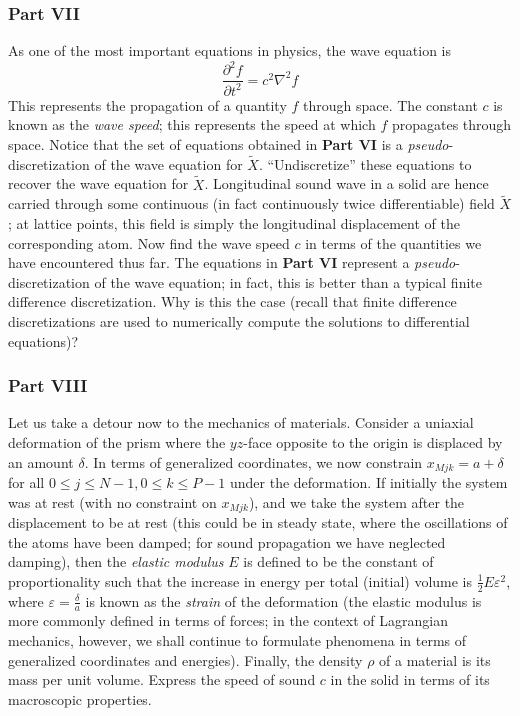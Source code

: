 \documentclass[letterpaper,12pt]{article}
\newcommand*{\npderiv}[3]{\frac{\partial^{#3} #1}{\partial #2^{#3}}}
\begin{document}
\begin{flushleft}
    \subsubsection*{Part VII}
    As one of the most important equations in physics, the wave equation is
    $$\npderiv{f}{t}{2} = c^2 \nabla^2 f$$
    This represents the propagation of a quantity $f$ through space. The constant $c$ is known as the \textit{wave speed}; this represents the speed at which $f$ propagates through space. Notice that the set of equations obtained in \textbf{Part VI} is a \textit{pseudo}-discretization of the wave equation for $\tilde{X}$. \newline\newline
    ``Undiscretize'' these equations to recover the wave equation for $\tilde{X}$. Longitudinal sound wave in a solid are hence carried through some continuous (in fact continuously twice differentiable) field $\tilde{X}$; at lattice points, this field is simply the longitudinal displacement of the corresponding atom. Now find the wave speed $c$ in terms of the quantities we have encountered thus far. The equations in \textbf{Part VI} represent a \textit{pseudo}-discretization of the wave equation; in fact, this is better than a typical finite difference discretization. Why is this the case (recall that finite difference discretizations are used to numerically compute the solutions to differential equations)?

    \subsubsection*{Part VIII}
    Let us take a detour now to the mechanics of materials. Consider a uniaxial deformation of the prism where the $yz$-face opposite to the origin is displaced by an amount $\delta$. In terms of generalized coordinates, we now constrain $x_{Mjk} = a + \delta$ for all $0 \leq j \leq N-1, 0 \leq k \leq P-1$ under the deformation. If initially the system was at rest (with no constraint on $x_{Mjk}$), and we take the system after the displacement to be at rest (this could be in steady state, where the oscillations of the atoms have been damped; for sound propagation we have neglected damping), then the \textit{elastic modulus} $E$ is defined to be the constant of proportionality such that the increase in energy per total (initial) volume is $\frac{1}{2}E\varepsilon^2$, where $\varepsilon = \frac{\delta}{a}$ is known as the \textit{strain} of the deformation (the elastic modulus is more commonly defined in terms of forces; in the context of Lagrangian mechanics, however, we shall continue to formulate phenomena in terms of generalized coordinates and energies). Finally, the density $\rho$ of a material is its mass per unit volume.\newline\newline
    Express the speed of sound $c$ in the solid in terms of its macroscopic properties.


\end{flushleft}
\end{document}
